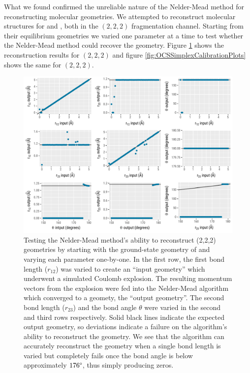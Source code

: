 What we found confirmed the unreliable nature of the Nelder-Mead method for reconstructing molecular geometries. We attempted to reconstruct molecular structures for  and , both in the $(2,2,2)$ fragmentation channel. Starting from their equilibrium geometries we varied one parameter at a time to test whether the Nelder-Mead method could recover the geometry. Figure \ref{fig:CO2SimplexCalibrationPlots} shows the reconstruction results for  $(2,2,2)$ and figure \ref{fig:OCSSimplexCalibrationPlots} shows the same for  $(2,2,2)$.

\begin{figure}
  \centering
  \includegraphics[width=\textwidth]{Plots/CO2SimplexCalibrationPlots}
  \caption[Testing the Nelder-Mead method's ability to reconstruct  (2,2,2) geometries]
  {Testing the Nelder-Mead method's ability to reconstruct  (2,2,2) geometries by starting with the ground-state geometry of  and varying each parameter one-by-one. In the first row, the first  bond length ($r_{12}$) was varied to create an ``input geometry'' which underwent a simulated Coulomb explosion. The resulting momentum vectors from the explosion were fed into the Nelder-Mead algorithm which converged to a geomety, the ``output geometry''. The second  bond length ($r_{23}$) and the bond angle $\theta$ were varied in the second and third rows respectively. Solid black lines indicate the expected output geometry, so deviations indicate a failure on the algorithm's ability to reconstruct the geometry. We see that the algorithm can accurately reconstruct the geometry when a single bond length is varied but completely fails once the bond angle is below approximately $176\degree$, thus simply producing zeros.}
  \label{fig:CO2SimplexCalibrationPlots}
\end{figure}

